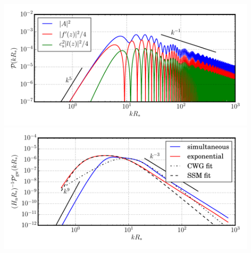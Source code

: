 \begin{frame}
\begin{columns}
\begin{column}{0.3\textwidth}
    \end{column}
    \begin{column}{0.4\textwidth}
        \includegraphics[width=\textwidth]{../fig/lecture_notes/one_bub_vw0.44alpha0.05_nz5k_nx10k-final3}
        \includegraphics[width=\textwidth]{../fig/lecture_notes/pow_gw_vw0.44alpha0.05_sim_1.0_exp_1.0_nz5k_nx10k_nT1000-final3}
    \end{column}
    \end{columns}
\end{frame}

